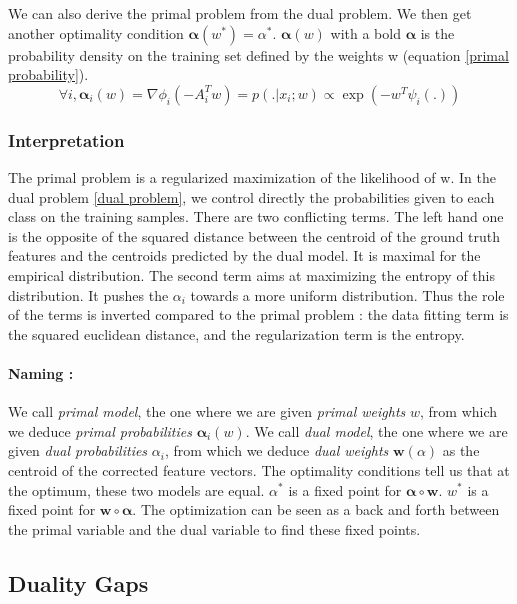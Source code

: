\documentclass{article}
\DeclareMathOperator{\1}{\mathbb{1}}
\begin{document}
We can also derive the primal problem from the dual problem.
We then get another optimality condition $\bm \alpha(w^*) = \alpha^*$.
$\bm \alpha(w)$ with a bold $\bm \alpha$ is the probability density on the training set defined by the weights w (equation \ref{primal probability}).
\begin{equation}
	\label{primal to dual}
	\forall i, \bm \alpha_i(w) = \nabla\phi_i(-A_i^Tw) = p(.|x_i; w) \propto \exp(-w^T \psi_i(.))
\end{equation}

\subsubsection*{Interpretation}
The primal problem is a regularized maximization of the likelihood of w. 
In the dual problem \ref{dual problem}, we control directly the probabilities given to each class on the training samples.
There are two conflicting terms.
The left hand one is the opposite of the squared distance between the centroid of the ground truth features and the centroids predicted by the dual model.
It is maximal for the empirical distribution.
The second term aims at maximizing the entropy of this distribution.
It pushes the $\alpha_i$ towards a more uniform distribution.
Thus the role of the terms is inverted compared to the primal problem : the data fitting term is the squared euclidean distance, and the regularization term is the entropy.

\paragraph{Naming :} 
We call \textit{primal model}, the one where we are given \textit{primal weights} $w$, from which we deduce \textit{primal probabilities} $\bm \alpha_i(w)$.
We call \textit{dual model}, the one where we are given \textit{dual probabilities} $\alpha_i$, from which we deduce \textit{dual weights} $\bm w(\alpha)$ as the centroid of the corrected feature vectors.
The optimality conditions tell us that at the optimum, these two models are equal.
$\alpha^*$ is a fixed point for $\bm \alpha \circ \bm w$.
$w^*$ is a fixed point for $\bm w \circ \bm \alpha$.
The optimization can be seen as a back and forth between the primal variable and the dual variable to find these fixed points.

\subsection{Duality Gaps}
\end{document}
